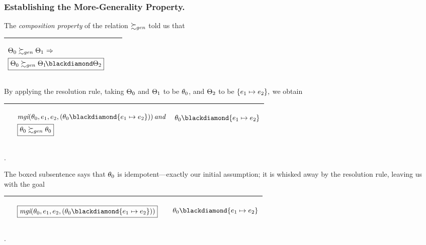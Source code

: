 \documentclass[runningheads]{llncs}
\DeclareMathOperator{\uand}{\emph{and}\,}
\DeclareMathOperator{\uimplies}{\Rightarrow}
\DeclareMathOperator{\mgi}{\emph{mgi}}
\begin{document}
\subsubsection{Establishing the More-Generality Property.}  The \emph{composition property} of the relation $\succsim_{gen}$ told us that
\begin{center}
  \begin{tabular}{|m{}|m{}||m{}|}
\hline
\begin{center}
{$
 {\begin{aligned}  
 &\Thet{0} \moregen \Thet{1} \, \uimplies \\
 &\boxed{\Thet{0} \moregen \Thet{1}\! \compose \Thet{2}}
 \end{aligned}}
$}
\end{center}& &  \\  \hline
\end{tabular}
\end{center}
By applying the resolution rule, taking $\Theta_{0}$ and $\Theta_{1}$ to be $\theta_{0}$, and $\Theta_{2}$ to be $\{e_{1} \mapsto  e_{2}\},$ we obtain
\begin{center}
\begin{tabular}{|m{}|m{}||m{}|}
 \hline 
  &\begin{center} 
$\begin{aligned}
  \,\, & {\mgi}(\thet{0}, \e{1}, \e{2}, (\thet{0} \compose \{\e{1} \mapsto  \e{2}\})) \uand \\
  &\boxed{\thet{0} \moregen \thet{0}}
  \end{aligned}$
\end{center}
& 
\begin{center}$\thet{0} \compose \{\e{1} \mapsto  \e{2}\}$ \end{center}\\
\hline
\end{tabular}.
\end{center}
The boxed subsentence says that $\theta_{0}$ is idempotent---exactly our initial assumption;  it is whisked away by the resolution rule, leaving us with the goal
\begin{center}
\begin{tabular}{|m{}|m{}||m{}|}
 \hline 
  &\begin{center} 
$\begin{aligned}
  \,\, & \boxed{{\mgi}(\thet{0}, \e{1}, \e{2}, (\thet{0} \compose \{\e{1} \mapsto  \e{2}\}))} 
  \end{aligned}$
\end{center}
& 
\begin{center}$\thet{0} \compose \{\e{1} \mapsto  \e{2}\}$ \end{center}\\
\hline
\end{tabular}.
\end{center}
\end{document}

